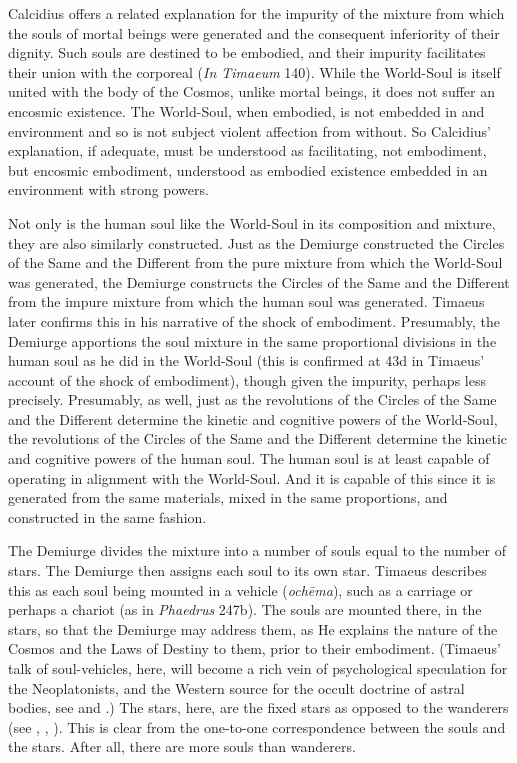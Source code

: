 Calcidius offers a related explanation for the impurity of the mixture from which the souls of mortal beings were generated and the consequent inferiority of their dignity. Such souls are destined to be embodied, and their impurity facilitates their union with the corporeal (\emph{In Timaeum} 140). While the World-Soul is itself united with the body of the Cosmos, unlike mortal beings, it does not suffer an encosmic existence. The World-Soul, when embodied, is not embedded in and environment and so is not subject violent affection from without. So Calcidius' explanation, if adequate, must be understood as facilitating, not embodiment, but encosmic embodiment, understood as embodied existence embedded in an environment with strong powers.

Not only is the human soul like the World-Soul in its composition and mixture, they are also similarly constructed. Just as the Demiurge constructed the Circles of the Same and the Different from the pure mixture from which the World-Soul was generated, the Demiurge constructs the Circles of the Same and the Different from the impure mixture from which the human soul was generated. Timaeus later confirms this in his narrative of the shock of embodiment. Presumably, the Demiurge apportions the soul mixture in the same proportional divisions in the human soul as he did in the World-Soul (this is confirmed at 43d in Timaeus' account of the shock of embodiment), though given the impurity, perhaps less precisely. Presumably, as well, just as the revolutions of the Circles of the Same and the Different determine the kinetic and cognitive powers of the World-Soul, the revolutions of the Circles of the Same and the Different determine the kinetic and cognitive powers of the human soul. The human soul is at least capable of operating in alignment with the World-Soul. And it is capable of this since it is generated from the same materials, mixed in the same proportions, and constructed in the same fashion.

The Demiurge divides the mixture into a number of souls equal to the number of stars. The Demiurge then assigns each soul to its own star. Timaeus describes this as each soul being mounted in a vehicle (\emph{ochēma}), such as a carriage or perhaps a chariot (as in \emph{Phaedrus} 247b). The souls are mounted there, in the stars, so that the Demiurge may address them, as He explains the nature of the Cosmos and the Laws of Destiny to them, prior to their embodiment. (Timaeus' talk of soul-vehicles, here, will become a rich vein of psychological speculation for the Neoplatonists, and the Western source for the occult doctrine of astral bodies, see \citealt[appendix 2]{Dodds:1963ul} and \citealt{Finamore:1985aa}.) The stars, here, are the fixed stars as opposed to the wanderers  (see \citealt[141--2 n13]{Archer-Hind:1888qd}, \citealt[255--6]{Taylor:1928qb}, \citealt[143]{Cornford:1935fk}). This is clear from the one-to-one correspondence between the souls and the stars. After all, there are more souls than wanderers.

